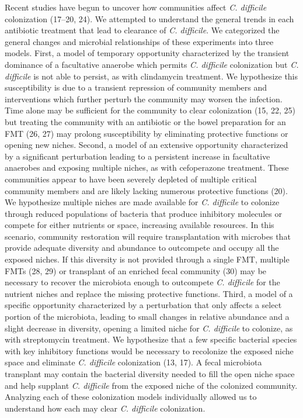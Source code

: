 \documentclass[12pt,]{article}
\begin{document}
Recent studies have begun to uncover how communities affect \emph{C.
difficile} colonization (17--20, 24). We attempted to understand the
general trends in each antibiotic treatment that lead to clearance of
\emph{C. difficile}. We categorized the general changes and microbial
relationships of these experiments into three models. First, a model of
temporary opportunity characterized by the transient dominance of a
facultative anaerobe which permits \emph{C. difficile} colonization but
\emph{C. difficile} is not able to persist, as with clindamycin
treatment. We hypothesize this susceptibility is due to a transient
repression of community members and interventions which further perturb
the community may worsen the infection. Time alone may be sufficient for
the community to clear colonization (15, 22, 25) but treating the
community with an antibiotic or the bowel preparation for an FMT (26,
27) may prolong susceptibility by eliminating protective functions or
opening new niches. Second, a model of an extensive opportunity
characterized by a significant perturbation leading to a persistent
increase in facultative anaerobes and exposing multiple niches, as with
cefoperazone treatment. These communities appear to have been severely
depleted of multiple critical community members and are likely lacking
numerous protective functions (20). We hypothesize multiple niches are
made available for \emph{C. difficile} to colonize through reduced
populations of bacteria that produce inhibitory molecules or compete for
either nutrients or space, increasing available resources. In this
scenario, community restoration will require transplantation with
microbes that provide adequate diversity and abundance to outcompete and
occupy all the exposed niches. If this diversity is not provided through
a single FMT, multiple FMTs (28, 29) or transplant of an enriched fecal
community (30) may be necessary to recover the microbiota enough to
outcompete \emph{C. difficile} for the nutrient niches and replace the
missing protective functions. Third, a model of a specific opportunity
characterized by a perturbation that only affects a select portion of
the microbiota, leading to small changes in relative abundance and a
slight decrease in diversity, opening a limited niche for \emph{C.
difficile} to colonize, as with streptomycin treatment. We hypothesize
that a few specific bacterial species with key inhibitory functions
would be necessary to recolonize the exposed niche space and eliminate
\emph{C. difficile} colonization (13, 17). A fecal microbiota transplant
may contain the bacterial diversity needed to fill the open niche space
and help supplant \emph{C. difficile} from the exposed niche of the
colonized community. Analyzing each of these colonization models
individually allowed us to understand how each may clear \emph{C.
difficile} colonization.
\end{document}
